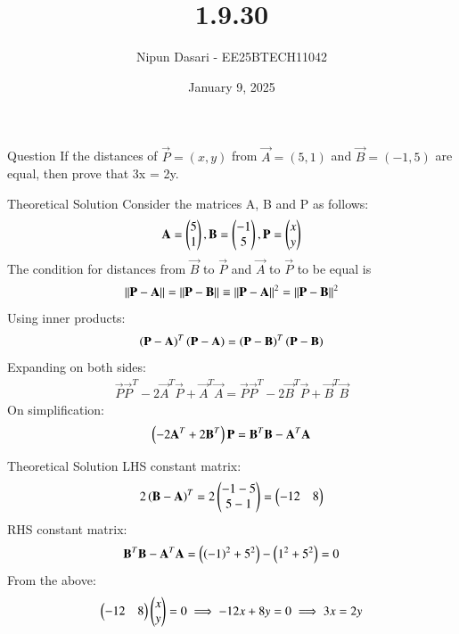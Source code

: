 \documentclass{beamer}
\title %
{1.9.30}
\date{January 9, 2025}
\author %
{Nipun Dasari - EE25BTECH11042}
\begin{document}
	
		\frame{\titlepage}
	\begin{frame}{Question}
		If the distances of $\vec{P} = (x, y)$ from $\vec{A} = (5, 1)$ and $\vec{B} = (−1, 5)$ are equal, then prove
		that 3x = 2y.
	\end{frame}

	
\begin{frame}{Theoretical Solution}
	Consider the matrices A, B and P as follows:
\begin{align*}
	\mathbf{A} = \begin{pmatrix}5 \\ 1\end{pmatrix}, \mathbf{B} = \begin{pmatrix}-1 \\ 5\end{pmatrix}, \mathbf{P}= \begin{pmatrix}x \\ y\end{pmatrix}
\end{align*}
The condition for distances from $\vec{B}$ to $\vec{P}$ and $\vec{A}$ to $\vec{P}$ to be equal is
\begin{align*}
	\left\lVert\mathbf{P}-\mathbf{A}\right\rVert = \left\lVert\mathbf{P}-\mathbf{B}\right\rVert \equiv \left\lVert\mathbf{P}-\mathbf{A}\right\rVert^2 = \left\lVert\mathbf{P}-\mathbf{B}\right\rVert^2
\end{align*}
Using inner products:
\begin{align*}
	\left(\mathbf{P}-\mathbf{A}\right)^{T}\left(\mathbf{P}-\mathbf{A}\right) = \left(\mathbf{P}-\mathbf{B}\right)^{T}\left(\mathbf{P}-\mathbf{B}\right)
\end{align*}
Expanding on both sides:
\begin{align*}
	\vec{P}\vec{P}^{T} - 2\vec{A}^{T}\vec{P} + \vec{A}^{T}\vec{A} = \vec{P}\vec{P}^{T} - 2\vec{B}^{T}\vec{P} + \vec{B}^{T}\vec{B}
\end{align*}
On simplification:
\begin{align*}
	\left(-2\mathbf{A}^{T} + 2\mathbf{B}^{T}\right)\mathbf{P} = \mathbf{B}^{T}\mathbf{B} - \mathbf{A}^{T}\mathbf{A}
\end{align*} 
\end{frame}
\begin{frame}{Theoretical Solution}
LHS constant matrix:
\begin{align*}
	2\left(\mathbf{B}-\mathbf{A}\right)^{T} = 2\begin{pmatrix}-1-5 \\ 5-1\end{pmatrix} = \begin{pmatrix}-12 & 8\end{pmatrix}	
\end{align*}
RHS constant matrix:
\begin{align*}
	\mathbf{B}^{T}\mathbf{B} - \mathbf{A}^{T}\mathbf{A} = \left(\left(-1\right)^2 + 5^2\right) - \left(1^2 + 5^2\right) = 0
\end{align*}
From the above:
\begin{align*}
	\begin{pmatrix}-12 & 8\end{pmatrix}\begin{pmatrix}x \\ y\end{pmatrix} = 0 \implies -12x + 8y = 0 \implies 3x = 2y
\end{align*}
	\end{frame}
	
\end{document}
